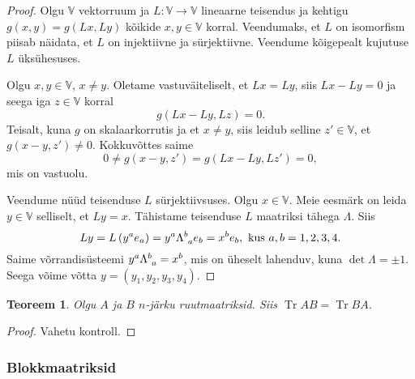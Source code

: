 \documentclass[12pt]{article}
\theoremstyle{plain}
\newtheorem{teoreem}{Teoreem}[section]
\theoremstyle{definition}
\numberwithin{equation}{section}
\def\V{{\mathbb V}}
\DeclareMathOperator{\Tr}{Tr}
\begin{document}
\begin{proof}
Olgu $\V$ vektorruum ja $L : \V \rightarrow \V$ 
lineaarne teisendus ja kehtigu $g \left(x, y\right) = 
g \left(Lx, Ly\right)$ kõikide $x, y \in \V$ korral. 
Veendumaks, et $L$ on isomorfism piisab näidata, et $L$ on 
injektiivne ja sürjektiivne. Veendume kõigepealt kujutuse 
$L$ üksühesuses.

Olgu $x, y \in \V$, $x \neq y$. Oletame vastuväiteliselt, 
et $Lx = Ly$, siis $Lx - Ly = 0$ ja seega iga $z \in \V$ korral
\begin{equation*}
g \left( Lx - Ly, Lz \right) = 0.
\end{equation*}
Teisalt, kuna $g$ on skalaarkorrutis ja et $x \neq y$, siis leidub 
selline $z' \in \V$, et $g \left( x - y, z' \right) \neq 0$. 
Kokkuvõttes saime
\begin{equation*}
0 \neq g \left (x-y,z'\right ) = g\left (Lx - Ly, Lz'\right ) = 0,
\end{equation*}
mis on vastuolu.

Veendume nüüd teisenduse $L$ sürjektiivsuses. Olgu $x \in \V$. 
Meie eesmärk on leida $y \in \V$ selliselt, et $Ly = x$. 
Tähistame teisenduse $L$ maatriksi tähega $\Lambda$. Siis
\[Ly = L\left(y^a e_a\right) = y^a \Lambda\indices{^b_a}e_b = 
x^b e_b, \text{ kus } a,b = 1,2,3,4.\]
Saime võrrandisüsteemi $y^a \Lambda\indices{^b_a} = x^b$, mis on 
üheselt lahenduv, kuna $\det \Lambda = \pm 1$. Seega võime võtta 
$y = (y_1, y_2, y_3, y_4)$.
\end{proof}

\begin{teoreem} \label{teor:trace}
Olgu $A$ ja $B$ $n$-järku ruutmaatriksid. Siis $\Tr AB = \Tr BA$.
\end{teoreem}
\begin{proof}
Vahetu kontroll.
\end{proof}

\subsubsection*{Blokkmaatriksid}
\end{document}
